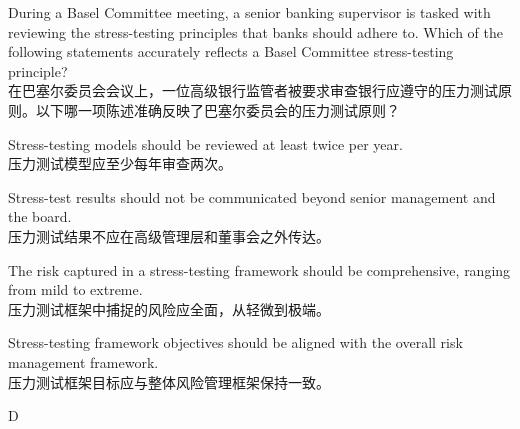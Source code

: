 \documentclass{article}
\newcounter{question} %
\begin{document}
\begin{question}
    During a Basel Committee meeting, a senior banking supervisor is tasked with reviewing the stress-testing principles that banks should adhere to. Which of the following statements accurately reflects a Basel Committee stress-testing principle?\\
    在巴塞尔委员会会议上，一位高级银行监管者被要求审查银行应遵守的压力测试原则。以下哪一项陈述准确反映了巴塞尔委员会的压力测试原则？    
\end{question}

\begin{choices}
    \item Stress-testing models should be reviewed at least twice per year.\\
    压力测试模型应至少每年审查两次。
    \item Stress-test results should not be communicated beyond senior management and the board.\\
    压力测试结果不应在高级管理层和董事会之外传达。
    \item The risk captured in a stress-testing framework should be comprehensive, ranging from mild to extreme.\\
    压力测试框架中捕捉的风险应全面，从轻微到极端。
    \item Stress-testing framework objectives should be aligned with the overall risk management framework.\\
    压力测试框架目标应与整体风险管理框架保持一致。
\end{choices}

\begin{correctanswer}
    D
\end{correctanswer}
\end{document}
